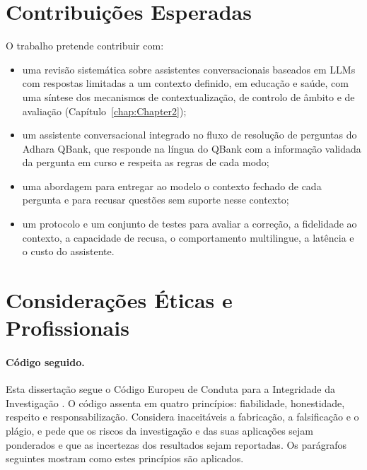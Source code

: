 \section{Contribuições Esperadas}
\label{sec:chap1_contributions}

O trabalho pretende contribuir com:
\begin{itemize}
    \item uma revisão sistemática sobre assistentes conversacionais baseados em \glspl{LLM} com respostas limitadas a um contexto definido, em educação e saúde, com uma síntese dos mecanismos de contextualização, de controlo de âmbito e de avaliação (Capítulo~\ref{chap:Chapter2});
    \item um assistente conversacional integrado no fluxo de resolução de perguntas do Adhara QBank, que responde na língua do QBank com a informação validada da pergunta em curso e respeita as regras de cada modo;
    \item uma abordagem para entregar ao modelo o contexto fechado de cada pergunta e para recusar questões sem suporte nesse contexto;
    \item um protocolo e um conjunto de testes para avaliar a correção, a fidelidade ao contexto, a capacidade de recusa, o comportamento multilingue, a latência e o custo do assistente.
\end{itemize}

\section{Considerações Éticas e Profissionais}
\label{sec:chap1_ethics}

\paragraph{Código seguido.} Esta dissertação segue o Código Europeu de Conduta para a Integridade da Investigação \parencite{allea2023code}. O código assenta em quatro princípios: fiabilidade, honestidade, respeito e responsabilização. Considera inaceitáveis a fabricação, a falsificação e o plágio, e pede que os riscos da investigação e das suas aplicações sejam ponderados e que as incertezas dos resultados sejam reportadas. Os parágrafos seguintes mostram como estes princípios são aplicados.

